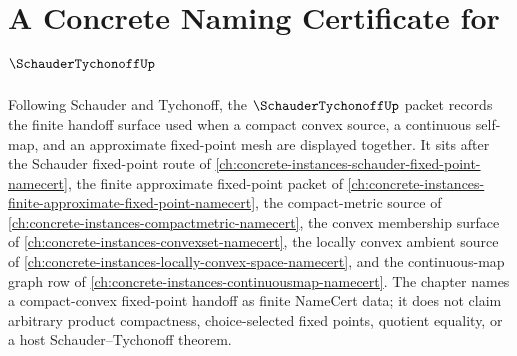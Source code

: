 \chapter{A Concrete Naming Certificate for $\SchauderTychonoffUp$}
\label{ch:concrete-instances-schauder-tychonoff-namecert}

Following Schauder and Tychonoff, the $\SchauderTychonoffUp$ packet records the finite handoff surface used when a compact convex source, a continuous self-map, and an approximate fixed-point mesh are displayed together. It sits after the Schauder fixed-point route of \autoref{ch:concrete-instances-schauder-fixed-point-namecert}, the finite approximate fixed-point packet of \autoref{ch:concrete-instances-finite-approximate-fixed-point-namecert}, the compact-metric source of \autoref{ch:concrete-instances-compactmetric-namecert}, the convex membership surface of \autoref{ch:concrete-instances-convexset-namecert}, the locally convex ambient source of \autoref{ch:concrete-instances-locally-convex-space-namecert}, and the continuous-map graph row of \autoref{ch:concrete-instances-continuousmap-namecert}. The chapter names a compact-convex fixed-point handoff as finite NameCert data; it does not claim arbitrary product compactness, choice-selected fixed points, quotient equality, or a host Schauder--Tychonoff theorem.

